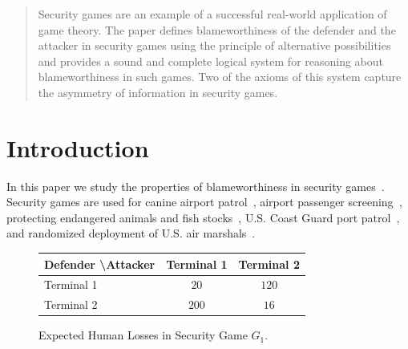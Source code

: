 \documentclass[letterpaper]{article}
\begin{document}
\maketitle

\begin{abstract}
Security games are an example of a successful real-world application of game theory. The paper defines blameworthiness of  the defender and the attacker in security games using the principle of alternative possibilities and provides a sound and complete logical system for reasoning about blameworthiness in such games. Two of the axioms of this system capture the asymmetry of information in security games.
\end{abstract}


\section{Introduction}

In this paper we study the properties of blameworthiness in security games~\cite{s34}. Security games are used for 
canine airport patrol~\cite{pjmoptwpk08aamas,jtpkrto10interfaces}, 
airport passenger screening~\cite{bsst16aaai},
protecting endangered animals and fish stocks~\cite{fst15ijcai}, 
U.S. Coast Guard port patrol~\cite{sfakt18ijcai,ats16ihs},
and randomized deployment of U.S. air marshals~\cite{sfakt18ijcai}.


\begin{figure}[ht]
\vspace{-1mm}
\begin{center}
\renewcommand{\arraystretch}{1.3}
\begin{tabular}{ l | c  c }
Defender \textbackslash Attacker  & Terminal 1 & Terminal 2  \\  \hline 
 Terminal 1 & $20$ & $120$ \\
 Terminal 2 & $200$ & $16$   
\end{tabular}
\caption{Expected Human Losses in Security Game $G_1$.}\label{losses figure}
\end{center}
\vspace{-3mm}
\end{figure}
\end{document}
